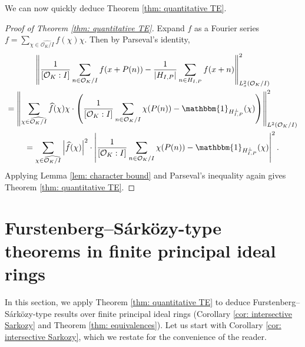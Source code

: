 \documentclass{amsart}
\theoremstyle{definition}
\numberwithin{equation}{section}
\newcommand{\mO}{\mathcal{O}}
\renewcommand{\hat}{\widehat}
\newcommand{\ind}{\mathbbm{1}}
\newcommand{\norm}[2]{\left\| #2 \right\|_{#1}}
\begin{document}
We can now quickly deduce Theorem \ref{thm: quantitative TE}.

\begin{proof}[Proof of Theorem \ref{thm: quantitative TE}]
	Expand $f$ as a Fourier series $f = \sum_{\chi \in \hat{\mO_K/I}} \hat{f}(\chi) \chi$.
    Then by Parseval's identity,
    \begin{multline*}
        \norm{L^2_x(\mO_K/I)}{\frac{1}{[\mO_K:I]}\sum_{n \in \mO_K/I} f(x+P(n)) - \frac{1}{|H_{I,P}|} \sum_{n \in H_{I,P}} f(x+n)}^2 \\
         = \norm{L^2(\mO_K/I)}{\sum_{\chi \in \hat{\mO_K/I}} \hat{f}(\chi) \chi \cdot \left( \frac{1}{[\mO_K:I]}\sum_{n \in \mO_K/I} \chi(P(n)) - \ind_{H_{I,P}^{\perp}}(\chi) \right)}^2 \\
         = \sum_{\chi \in \hat{\mO_K/I}} \left| \hat{f}(\chi) \right|^2 \cdot \left| \frac{1}{[\mO_K:I]}\sum_{n \in \mO_K/I} \chi(P(n)) - \ind_{H_{I,P}^{\perp}}(\chi) \right|^2.
    \end{multline*}
    Applying Lemma \ref{lem: character bound} and Parseval's inequality again gives Theorem \ref{thm: quantitative TE}.
\end{proof}


\section{Furstenberg--S\'{a}rk\"{o}zy-type theorems in finite principal ideal rings} \label{sec:FS good rings}

In this section, we apply Theorem \ref{thm: quantitative TE} to deduce Furstenberg--S\'{a}rk\"{o}zy-type results over finite principal ideal rings (Corollary \ref{cor: intersective Sarkozy} and Theorem \ref{thm: equivalences}).
Let us start with Corollary \ref{cor: intersective Sarkozy}, which we restate for the convenience of the reader.

\Sarkozy*
\end{document}
